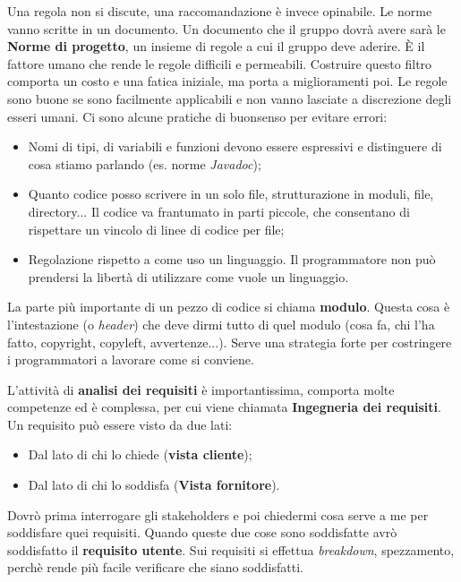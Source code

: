 Una regola non si discute, una raccomandazione è invece opinabile. Le norme vanno scritte in un documento. Un documento che il gruppo dovrà avere sarà le \textbf{Norme di progetto}, un insieme di regole a cui il gruppo deve aderire. È il fattore umano che rende le regole difficili e permeabili. Costruire questo filtro comporta un costo e una fatica iniziale, ma porta a miglioramenti poi. Le regole sono buone se sono facilmente applicabili e non vanno lasciate a discrezione degli esseri umani. Ci sono alcune pratiche di buonsenso per evitare errori:

\begin{itemize}

	\item Nomi di tipi, di variabili e funzioni devono essere espressivi e distinguere di cosa stiamo parlando (es. norme \textit{Javadoc});
	\item Quanto codice posso scrivere in un solo file, strutturazione in moduli, file, directory... Il codice va frantumato in parti piccole, che consentano di rispettare un vincolo di linee di codice per file;
	\item Regolazione rispetto a come uso un linguaggio. Il programmatore non può prendersi la libertà di utilizzare come vuole un linguaggio.

\end{itemize}

La parte più importante di un pezzo di codice si chiama \textbf{modulo}. Questa cosa è l'intestazione (o \textit{header}) che deve dirmi tutto di quel modulo (cosa fa, chi l'ha fatto, copyright, copyleft, avvertenze...). Serve una strategia forte per costringere i programmatori a lavorare come si conviene.

L'attività di \textbf{analisi dei requisiti} è importantissima, comporta molte competenze ed è complessa, per cui viene chiamata \textbf{Ingegneria dei requisiti}. Un requisito può essere visto da due lati:

\begin{itemize}

	\item Dal lato di chi lo chiede (\textbf{vista cliente});
	\item Dal lato di chi lo soddisfa (\textbf{Vista fornitore}).

\end{itemize}

Dovrò prima interrogare gli stakeholders e poi chiedermi cosa serve a me per soddisfare quei requisiti. Quando queste due cose sono soddisfatte avrò soddisfatto il \textbf{requisito utente}. Sui requisiti si effettua \textit{breakdown}, spezzamento, perchè rende più facile verificare che siano soddisfatti.

